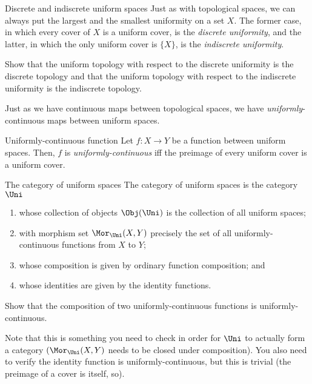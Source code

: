 \begin{exm}{Discrete and indiscrete uniform spaces}{}
Just as with topological spaces, we can always put the largest and the smallest uniformity on a set $X$.  The former case, in which every cover of $X$ is a uniform cover, is the \emph{discrete uniformity}, and the latter, in which the only uniform cover is $\{ X\}$, is the \emph{indiscrete uniformity}.
\begin{exr}[breakable=false]{}{}
Show that the uniform topology with respect to the discrete uniformity is the discrete topology and that the uniform topology with respect to the indiscrete uniformity is the indiscrete topology.
\end{exr}
\end{exm}

Just as we have continuous maps between topological spaces, we have \emph{uniformly}-continuous maps between uniform spaces.
\begin{dfn}{Uniformly-continuous function}{}
Let $f\colon X\rightarrow Y$ be a function between uniform spaces.  Then, $f$ is \emph{uniformly-continuous} iff the preimage of every uniform cover is a uniform cover.
\end{dfn}
\begin{exm}{The category of uniform spaces}{}
The category of uniform spaces is the category $\Uni$\index[notation]{$\Uni$}
\begin{enumerate}
\item whose collection of objects $\Obj (\Uni )$ is the collection of all uniform spaces;
\item with morphism set $\Mor _{\Uni}(X,Y)$ precisely the set of all uniformly-continuous functions from $X$ to $Y$;
\item whose composition is given by ordinary function composition; and
\item whose identities are given by the identity functions.
\end{enumerate}
\begin{exr}[breakable=false]{}{}
Show that the composition of two uniformly-continuous functions is uniformly-continuous.
\begin{rmk}
Note that this is something you need to check in order for $\Uni$ to actually form a category $(\Mor _{\Uni}(X,Y)$ needs to be closed under composition).  You also need to verify the identity function is uniformly-continuous, but this is trivial (the preimage of a cover is itself, so\textellipsis ).
\end{rmk}
\end{exr}
\end{exm}
